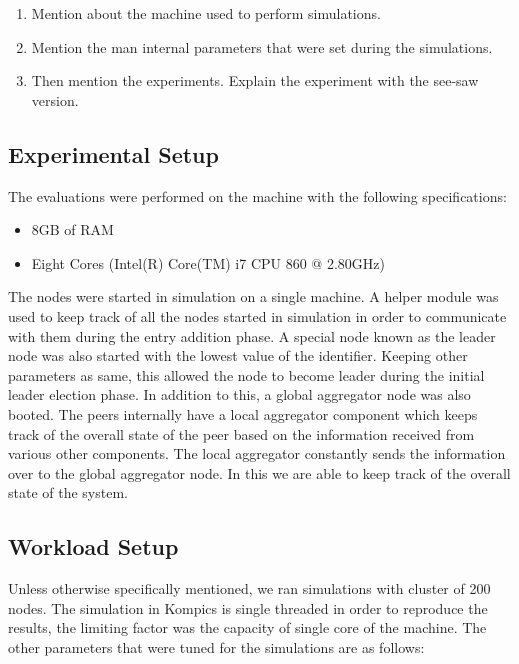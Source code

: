 \documentclass[a4paper, 11pt]{article}
\begin{document}
\begin{enumerate}

\item Mention about the machine used to perform simulations.
\item Mention the man internal parameters that were set during the simulations.
\item Then mention the experiments. Explain the experiment with the see-saw version.


\end{enumerate}





\subsection{Experimental Setup}

The evaluations were performed on the machine with the following specifications:

\begin{itemize}

\item 8GB of RAM
\item Eight Cores (Intel(R) Core(TM) i7 CPU 860  @ 2.80GHz)
\end{itemize}

The nodes were started in simulation on a single machine. A helper module was used to keep track of all the nodes started in simulation in order to communicate with them during the entry addition phase. A special node known as the leader node was also started with the lowest value of the identifier. Keeping other parameters as same, this allowed the node to become leader during the initial leader election phase. In addition to this, a global aggregator node was also booted. The peers internally have a local aggregator component which keeps track of the overall state of the peer based on the information received from various other components. The local aggregator constantly sends the information over to the global aggregator node. In this we are able to keep track of the overall state of the system.



\subsection{Workload Setup}

Unless otherwise specifically mentioned, we ran simulations with cluster of 200 nodes. The simulation in Kompics is single threaded in order to reproduce the results, the limiting factor was the capacity of single core of the machine. The other parameters that were tuned for the simulations are as follows:
\end{document}

